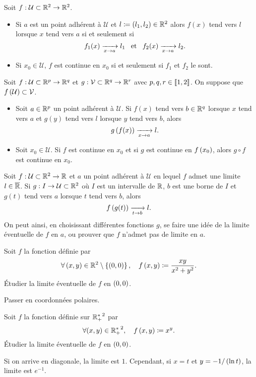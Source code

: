 \documentclass{magnolia}
\begin{document}
\begin{proposition}
Soit $f:\mathcal{U}\subset\mathbb{R}^2\to\mathbb{R}^2$.
\begin{itemize}
\item Si $a$ est un point adhérent à $\mathcal{U}$ et $l\coloneqq\left(l_1,l_2\right)\in\mathbb{R}^2$
  alors $f(x)$ tend vers $l$ lorsque $x$ tend vers $a$ si et seulement si
  \[f_{1}(x) \xrightarrow[x\rightarrow a]{} l_1 \quad\!\text{et}\quad\! f_{2}(x) \xrightarrow[x\rightarrow a]{} l_2.\]
\item Si $x_0\in\mathcal{U}$, $f$ est continue en $x_0$ si et seulement si
  $f_{1}$ et $f_{2}$ le sont.
\end{itemize}
\end{proposition}

\begin{proposition}
Soit $f:\mathcal{U}\subset\mathbb{R}^p\to\mathbb{R}^q$ et $g:\mathcal{V}\subset\mathbb{R}^q\to\mathbb{R}^r$
avec $p,q,r\in\left\llbracket 1,2\right\rrbracket$. On suppose que
$f\left(\mathcal{U}\right)\subset\mathcal{V}$.
\begin{itemize}
\item Soit $a\in\mathbb{R}^p$ un point adhérent à $\mathcal{U}$. Si $f(x)$ tend
  vers $b\in\mathbb{R}^q$ lorsque $x$ tend vers $a$ et $g(y)$ tend vers $l$ lorsque
  $y$ tend vers $b$, alors
  \[g\left(f(x)\right)\xrightarrow[x\rightarrow a]{} l.\]
\item Soit $x_0\in\mathcal{U}$. Si $f$ est continue en $x_0$ et si $g$ est
  continue en $f\left(x_0\right)$, alors $g\circ f$ est continue en $x_0$.
\end{itemize}
\end{proposition}

\begin{remarqueUnique}
\remarque Soit $f:\mathcal{U}\subset\mathbb{R}^2\to\mathbb{R}$ et $a$ un point adhérent à
  $\mathcal{U}$ en lequel $f$ admet une limite $l\in\overline{\mathbb{R}}$. Si
  $g:I\to\mathcal{U}\subset\mathbb{R}^2$ où $I$ est un intervalle de $\mathbb{R}$, $b$ est une
  borne de $I$ et $g(t)$ tend vers $a$ lorsque $t$ tend vers $b$, alors
  \[f\left(g(t)\right)\xrightarrow[t\rightarrow b]{}  l.\]
  On peut ainsi, en choisissant différentes fonctions $g$, se faire une idée de
  la limite éventuelle de $f$ en $a$, ou prouver que $f$ n'admet pas de limite
  en $a$.
\end{remarqueUnique}


\begin{exos}
\exo Soit $f$ la fonction définie par
  \[\forall\left(x,y\right)\in\mathbb{R}^2\setminus\left\{\left(0,0\right)\right\} ,\quad f\left(x,y\right)\coloneqq
    \frac{xy}{x^2+y^2}.\]
  Étudier la limite éventuelle de $f$ en $\left(0,0\right)$.
  \begin{sol}
  Passer en coordonnées polaires.
  \end{sol}
\exo Soit $f$ la fonction définie sur ${\mathbb{R}_+^*}^2$ par
  \[\forall (x,y)\in{\mathbb{R}_+^*}^2 ,\quad f\left(x,y\right)\coloneqq x^y.\]
  Étudier la limite éventuelle de $f$ en $\left(0,0\right)$.
  \begin{sol}
  Si on arrive en diagonale, la limite est $1$. Cependant, si $x=t$ et
  $y=-1/\left(\ln t\right)$, la limite est $e^{-1}$.
  \end{sol}
\end{exos}
\end{document}
